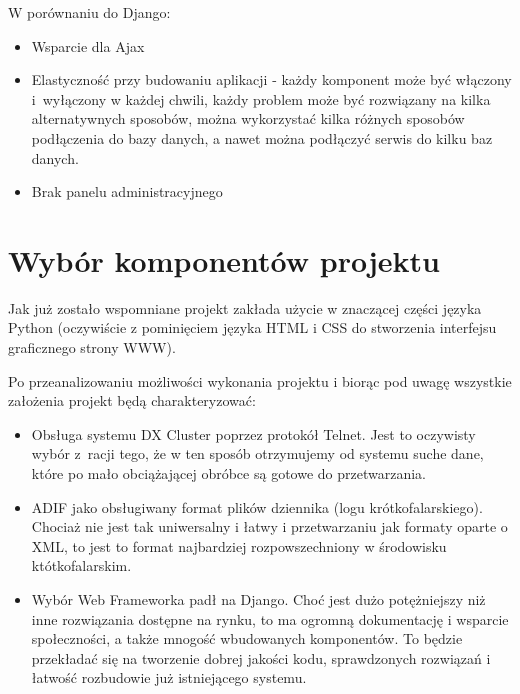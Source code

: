 \documentclass[]{mgr}
\begin{document}
            W porównaniu do Django:
            \begin{itemize}
                \item Wsparcie dla Ajax
                \item Elastyczność przy budowaniu aplikacji - każdy komponent może być włączony i~wyłączony w każdej chwili, każdy problem może być rozwiązany na kilka alternatywnych sposobów, można wykorzystać kilka różnych sposobów podłączenia do bazy danych, a nawet można podłączyć serwis do kilku baz danych.
                \item Brak panelu administracyjnego
            \end{itemize}

        \section{Wybór komponentów projektu}
        Jak już zostało wspomniane projekt zakłada użycie w znaczącej części języka Python (oczywiście z pominięciem języka HTML i CSS do stworzenia interfejsu graficznego strony WWW).

        Po przeanalizowaniu możliwości wykonania projektu i biorąc pod uwagę wszystkie założenia projekt będą charakteryzować:
        \begin{itemize}
            \item Obsługa systemu DX Cluster poprzez protokół Telnet. Jest to oczywisty wybór z~racji tego, że w ten sposób otrzymujemy od systemu suche dane, które po mało obciążającej obróbce są gotowe do przetwarzania.
            \item ADIF jako obsługiwany format plików dziennika (logu krótkofalarskiego). Chociaż nie jest tak uniwersalny i łatwy i przetwarzaniu jak formaty oparte o XML, to jest to format najbardziej rozpowszechniony w środowisku któtkofalarskim.
            \item Wybór Web Frameworka padł na Django. Choć jest dużo potężniejszy niż inne rozwiązania dostępne na rynku, to ma ogromną dokumentację i wsparcie społeczności, a także mnogość wbudowanych komponentów. To będzie przekładać się na tworzenie dobrej jakości kodu, sprawdzonych rozwiązań i łatwość rozbudowie już istniejącego systemu.
        \end{itemize}
\end{document}
